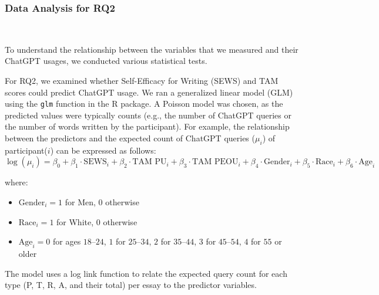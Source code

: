 \documentclass[manuscript,screen,acmsmall]{acmart}
\begin{document}

\subsubsection{Data Analysis for RQ2}\

To understand the relationship between the variables that we measured and their ChatGPT usages, we conducted various statistical tests. 

For RQ2, we examined whether Self-Efficacy for Writing (SEWS) and TAM scores could predict ChatGPT usage. We ran a generalized linear model (GLM) using the \texttt{glm} function in the R package. A Poisson model was chosen, as the predicted values were typically counts (e.g., the number of ChatGPT queries or the number of words written by the participant). For example, the relationship between the predictors and the expected count of ChatGPT queries ($\mu_i$) of participant($i$) can be expressed as follows: 
\[
\log(\mu_i) = \beta_0 + \beta_1 \cdot \text{SEWS}_i + \beta_2 \cdot \text{TAM PU}_i + \beta_3 \cdot \text{TAM PEOU}_i + \beta_4 \cdot \text{Gender}_i + \beta_5 \cdot \text{Race}_i + \beta_6 \cdot \text{Age}_i
\]

\noindent
where:
\begin{itemize}
    \item $\text{Gender}_i = 1$ for Men, $0$ otherwise
    \item $\text{Race}_i = 1$ for White, $0$ otherwise
    \item $\text{Age}_i = 0$ for ages $18\text{--}24$, $1$ for $25\text{--}34$, $2$ for $35\text{--}44$, $3$ for $45\text{--}54$,  $4$ for $55$ or older
\end{itemize}
\noindent The model uses a log link function to relate the expected query count for each type (P, T, R, A, and their total) per essay to the predictor variables.
\end{document}
